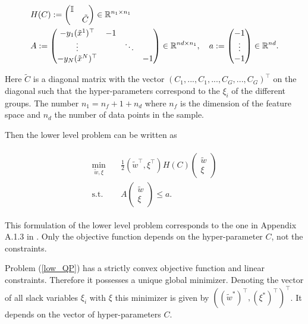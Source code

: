 \begin{equation*}
\begin{split}
	&H(C):= \begin{pmatrix} \mathbb{I} \\ & \tilde{C}\end{pmatrix}\in \mathbb{R}^{n_1\times n_1} \\
	&A := \begin{pmatrix}	-y_1(\tilde{x}^1)^{\top} & -1 \\
		\vdots & & \ddots \\ -y_N(\tilde{x}^N)^{\top} & & & -1\end{pmatrix} \in \mathbb{R}^{nd \times n_1}, \quad  a:= \begin{pmatrix}-1\\\vdots\\-1\end{pmatrix} \in \mathbb{R}^{nd}.
		\label{matrices}
\end{split}
\end{equation*}

Here \(\tilde{C}\) is a diagonal matrix with the vector \((C_1,...,C_1,...,C_G,...,C_G)^{\top}\) on the diagonal such that the hyper-parameters correspond to the \(\xi_i\) of the different groups. The number \(n_1 = n_f+1+n_d\) where \(n_f\) is the dimension of the feature space and \(n_d\) the number of data points in the sample.

Then the lower level problem can be written as

\begin{align}
\begin{split}
	\min_{\tilde{w},\xi} & \quad \frac{1}{2} (\tilde{w}^{\top},\xi^{\top}) H(C) \begin{pmatrix}\tilde{w}\\\xi\end{pmatrix} \\
	\text{s.t.} & \quad A \begin{pmatrix}\tilde{w}\\\xi\end{pmatrix} \leq a.
\end{split}
\label{low_QP}
\end{align}

This formulation of the lower level problem corresponds to the one in Appendix A.1.3 in \cite{Outrata1998}. Only the objective function depends on the hyper-parameter \(C\), not the constraints.

Problem (\ref{low_QP}) has a strictly convex objective function and linear constraints. Therefore it possesses a unique global minimizer. Denoting the vector of all slack variables \(\xi_i\) with \(\xi\) this minimizer is given by \(((\tilde{w}^*)^{\top},(\xi^*)^{\top})^{\top}\). It depends on the vector of hyper-parameters \(C\).

